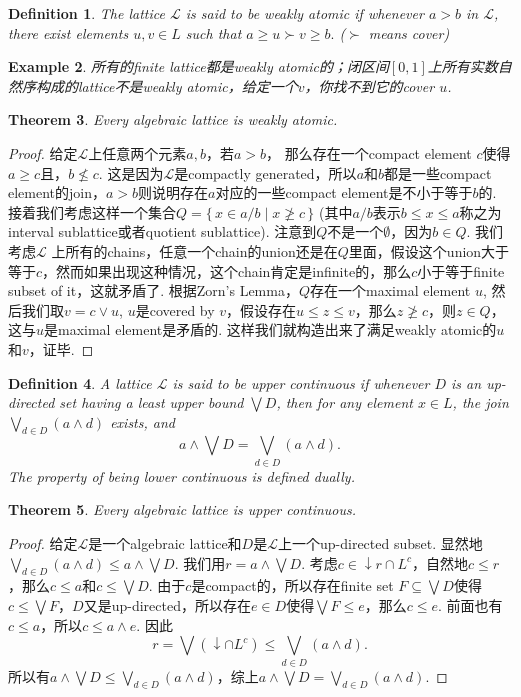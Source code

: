 \documentclass{article}
\newtheorem{theorem}{Theorem}[section]
\newtheorem{example}[theorem]{Example}
\newtheorem{definition}[theorem]{Definition}
\newcommand\Set[2]{\{\,#1\mid#2\,\}} %
\newcommand\lattice{\mathcal{L}}
\begin{document}
\begin{definition}
\rm The lattice $\lattice$ is said to be {\color{red} weakly atomic} if whenever $a > b$ in $\lattice$, there exist elements $u,v \in L$ such that $a \geq u \succ v \geq b.$ ($\succ$ means cover)
\end{definition}

\begin{example}
\rm 所有的finite lattice都是weakly atomic的；闭区间$[0,1]$上所有实数自然序构成的lattice不是weakly atomic，给定一个$v$，你找不到它的cover $u$.
\end{example}

\begin{theorem}
\rm Every algebraic lattice is weakly atomic.
\end{theorem}

\begin{proof}
给定$\lattice$上任意两个元素$a,b$，若$a > b$， 那么存在一个compact element $c$使得$a \geq c$且，$b \nleq c$. 这是因为$\lattice$是compactly generated，所以$a$和$b$都是一些compact element的join，$a>b$则说明存在$a$对应的一些compact element是不小于等于$b$的. 接着我们考虑这样一个集合$Q=\Set{x \in a/b}{x \ngeq c}$ (其中$a/b$表示$b \leq x \leq a$称之为interval sublattice或者quotient sublattice). 注意到$Q$不是一个$\emptyset$，因为$b \in Q$. 我们考虑$\lattice$ 上所有的chains，任意一个chain的union还是在$Q$里面，假设这个union大于等于$c$，然而如果出现这种情况，这个chain肯定是infinite的，那么$c$小于等于finite subset of it，这就矛盾了. 根据Zorn's Lemma，$Q$存在一个maximal element $u$, 然后我们取$v = c \vee u$, $u$是covered by $v$，假设存在$u \leq z \leq v$，那么$z \ngeq c$，则$z \in Q$，这与$u$是maximal element是矛盾的. 这样我们就构造出来了满足weakly atomic的$u$和$v$，证毕. 
\end{proof}

\begin{definition}
\rm A lattice $\lattice$ is said to be {\color{red} upper continuous} if whenever $D$ is an up-directed set having a least upper bound $\bigvee D$, then for any element $x \in L$, the join $\bigvee_{d \in D}(a \wedge d)$ exists, and 
$$
a \wedge \bigvee D = \bigvee_{d \in D}(a \wedge d).
$$
The property of being lower continuous is defined dually.
\end{definition}

\begin{theorem}
\rm Every algebraic lattice is upper continuous.
\end{theorem}

\begin{proof}
给定$\lattice$是一个algebraic lattice和$D$是$\lattice$上一个up-directed subset. 显然地$\bigvee_{d \in D}(a \wedge d) \leq a \wedge \bigvee D$. 我们用$r = a \wedge \bigvee D$. 考虑$c \in \downarrow r \cap L^c$，自然地$c \leq r$，那么$c \leq a$和$c \leq \bigvee D$. 由于$c$是compact的，所以存在finite set $F \subseteq \bigvee D$使得$c \leq \bigvee F$，$D$又是up-directed，所以存在$e \in D$使得$\bigvee F \leq e$，那么$c \leq e$. 前面也有$c \leq a$，所以$c \leq a \wedge e$. 因此
$$
r = \bigvee (\downarrow \cap L^c) \leq \bigvee_{d \in D}(a \wedge d).
$$
所以有$a \wedge \bigvee D \leq \bigvee_{d \in D}(a \wedge d)$，综上$a \wedge \bigvee D = \bigvee_{d \in D}(a \wedge d)$. 
\end{proof}
\end{document}
